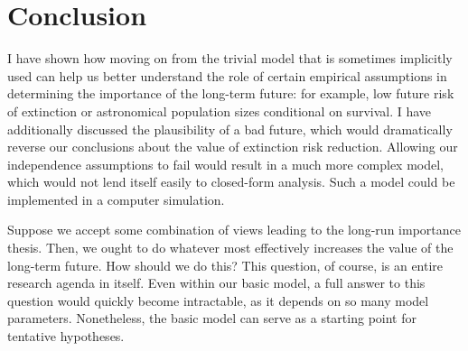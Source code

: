 \documentclass[british]{article}
\begin{document}
\section{Conclusion}\label{conclusion}
I have shown how moving on from the trivial model that is sometimes implicitly used can help us better understand the role of certain empirical assumptions in determining the importance of the long-term future: for example, low future risk of extinction or astronomical population sizes conditional on survival. I have additionally discussed the plausibility of a bad future, which would dramatically reverse our conclusions about the value of extinction risk reduction. Allowing our independence assumptions to fail would result in a much more complex model, which would not lend itself easily to closed-form analysis. Such a model could be implemented in a computer simulation.

Suppose we accept some combination of views leading to the long-run importance thesis. Then, we ought to do whatever most effectively increases the value of the long-term future. How should we do this? This question, of course, is an entire research agenda in itself. Even within our basic model, a full answer to this question would quickly become intractable, as it depends on so many model parameters. Nonetheless, the basic model can serve as a starting point for tentative hypotheses.
\pagebreak
\tableofcontents

\end{document}
